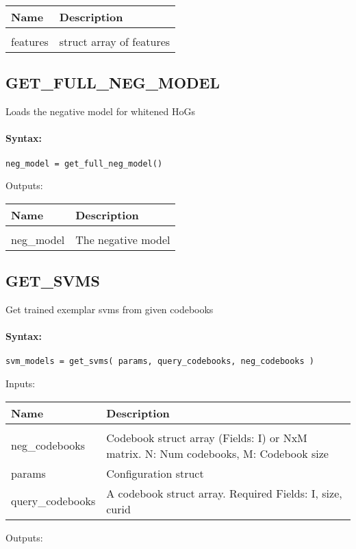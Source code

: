\begin{tabular}{|l|p{5cm}|}
\hline
\textbf{Name} & \textbf{Description} \\
\hline \hline \\
features & struct array of features  \\ \hline
\end{tabular}

\subsection{GET\_FULL\_NEG\_MODEL}

Loads the negative model for whitened HoGs

\paragraph{Syntax:} \verb|neg_model = get_full_neg_model()|

Outputs:

\begin{tabular}{|l|p{5cm}|}
\hline
\textbf{Name} & \textbf{Description} \\
\hline \hline \\
neg\_model & The negative model  \\ \hline
\end{tabular}

\subsection{GET\_SVMS}

Get trained exemplar svms from given codebooks

\paragraph{Syntax:} \verb|svm_models = get_svms( params, query_codebooks, neg_codebooks )|

Inputs:

\begin{tabular}{|l|p{5cm}|}
\hline
\textbf{Name} & \textbf{Description} \\
\hline \hline \\
neg\_codebooks & Codebook struct array (Fields: I) or NxM matrix. N: Num codebooks, M: Codebook size  \\ \hline
params & Configuration struct  \\ \hline
query\_codebooks & A codebook struct array. Required Fields: I, size, curid  \\ \hline
\end{tabular}
Outputs:


